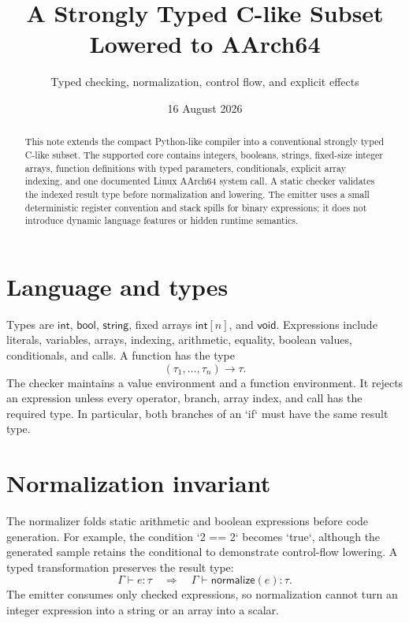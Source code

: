 \documentclass[11pt,a4paper]{article}
\title{A Strongly Typed C-like Subset Lowered to AArch64}
\author{Typed checking, normalization, control flow, and explicit effects}
\date{16 August 2026}
\begin{document}
\maketitle
\begin{abstract}
This note extends the compact Python-like compiler into a conventional strongly typed C-like subset. The supported core contains integers, booleans, strings, fixed-size integer arrays, function definitions with typed parameters, conditionals, explicit array indexing, and one documented Linux AArch64 system call. A static checker validates the indexed result type before normalization and lowering. The emitter uses a small deterministic register convention and stack spills for binary expressions; it does not introduce dynamic language features or hidden runtime semantics.
\end{abstract}
\section{Language and types}
Types are $\mathsf{int}$, $\mathsf{bool}$, $\mathsf{string}$, fixed arrays $\mathsf{int}[n]$, and $\mathsf{void}$. Expressions include literals, variables, arrays, indexing, arithmetic, equality, boolean values, conditionals, and calls. A function has the type
\[
(\tau_1,\ldots,\tau_n)\to\tau.
\]
The checker maintains a value environment and a function environment. It rejects an expression unless every operator, branch, array index, and call has the required type. In particular, both branches of an `if` must have the same result type.

\section{Normalization invariant}
The normalizer folds static arithmetic and boolean expressions before code generation. For example, the condition `2 == 2` becomes `true`, although the generated sample retains the conditional to demonstrate control-flow lowering. A typed transformation preserves the result type:
\[
\Gamma\vdash e:\tau\quad\Longrightarrow\quad
\Gamma\vdash\mathsf{normalize}(e):\tau.
\]
The emitter consumes only checked expressions, so normalization cannot turn an integer expression into a string or an array into a scalar.
\end{document}
